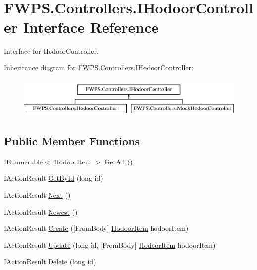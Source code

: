 \hypertarget{interface_f_w_p_s_1_1_controllers_1_1_i_hodoor_controller}{}\section{F\+W\+P\+S.\+Controllers.\+I\+Hodoor\+Controller Interface Reference}
\label{interface_f_w_p_s_1_1_controllers_1_1_i_hodoor_controller}


Interface for \mbox{\hyperlink{class_f_w_p_s_1_1_controllers_1_1_hodoor_controller}{Hodoor\+Controller}}.  


Inheritance diagram for F\+W\+P\+S.\+Controllers.\+I\+Hodoor\+Controller\+:\begin{figure}[H]
\begin{center}
\leavevmode
\includegraphics[height=2.000000cm]{interface_f_w_p_s_1_1_controllers_1_1_i_hodoor_controller}
\end{center}
\end{figure}
\subsection*{Public Member Functions}
\begin{DoxyCompactItemize}
\item 
I\+Enumerable$<$ \mbox{\hyperlink{class_f_w_p_s_1_1_models_1_1_hodoor_item}{Hodoor\+Item}} $>$ \mbox{\hyperlink{interface_f_w_p_s_1_1_controllers_1_1_i_hodoor_controller_ac50e7afd931ca1f16f767cac2fae488e}{Get\+All}} ()
\item 
I\+Action\+Result \mbox{\hyperlink{interface_f_w_p_s_1_1_controllers_1_1_i_hodoor_controller_a7676bf587ad504f1e5e7c1802f964489}{Get\+By\+Id}} (long id)
\item 
I\+Action\+Result \mbox{\hyperlink{interface_f_w_p_s_1_1_controllers_1_1_i_hodoor_controller_a106763414af6e583aa8e73c23daeab2e}{Next}} ()
\item 
I\+Action\+Result \mbox{\hyperlink{interface_f_w_p_s_1_1_controllers_1_1_i_hodoor_controller_a39f296accada798a0f161ba8e0ad8777}{Newest}} ()
\item 
I\+Action\+Result \mbox{\hyperlink{interface_f_w_p_s_1_1_controllers_1_1_i_hodoor_controller_af4ec9b2bea258465475226f9693e26b3}{Create}} (\mbox{[}From\+Body\mbox{]} \mbox{\hyperlink{class_f_w_p_s_1_1_models_1_1_hodoor_item}{Hodoor\+Item}} hodoor\+Item)
\item 
I\+Action\+Result \mbox{\hyperlink{interface_f_w_p_s_1_1_controllers_1_1_i_hodoor_controller_a9550c77b49185af0d0e6ba79514535f5}{Update}} (long id, \mbox{[}From\+Body\mbox{]} \mbox{\hyperlink{class_f_w_p_s_1_1_models_1_1_hodoor_item}{Hodoor\+Item}} hodoor\+Item)
\item 
I\+Action\+Result \mbox{\hyperlink{interface_f_w_p_s_1_1_controllers_1_1_i_hodoor_controller_a8fe985f1171b270cd663c1e16bb198ee}{Delete}} (long id)
\end{DoxyCompactItemize}


